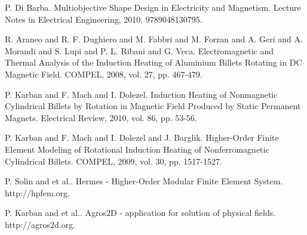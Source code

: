 
\begin{thebibliography}{10}

{\sc P. Di Barba}. {Multiobjective Shape Design in Electricity and Magnetism}. Lecture Notes in Electrical Engineering, 2010, 9789048130795.



{\sc R. Araneo and R. F. Dughiero and M. Fabbri and M. Forzan and A. Geri and A. Morandi and S. Lupi and P. L. Ribani and G. Veca}. {Electromagnetic and Thermal Analysis of the Induction Heating of Aluminium Billets Rotating in DC Magnetic Field}. COMPEL, 2008, vol. 27, pp. 467-479.



{\sc P. Karban and F. Mach and I. Dolezel}. {Induction Heating of Nonmagnetic Cylindrical Billets by Rotation in Magnetic Field Produced by Static Permanent Magnets}. Electrical Review, 2010, vol. 86, pp. 53-56.



{\sc P. Karban and F. Mach and I. Dolezel and J. Barglik}. {Higher-Order Finite Element Modeling of Rotational Induction Heating of Nonferromagnetic Cylindrical Billets}. COMPEL, 2009, vol. 30, pp. 1517-1527.



{\sc P. Solin and et al.}. {Hermes - Higher-Order Modular Finite Element System}. http://hpfem.org.



{\sc P. Karban and et al.}. {Agros2D - application for solution of physical fields}. http://agros2d.org.

\end{thebibliography}
